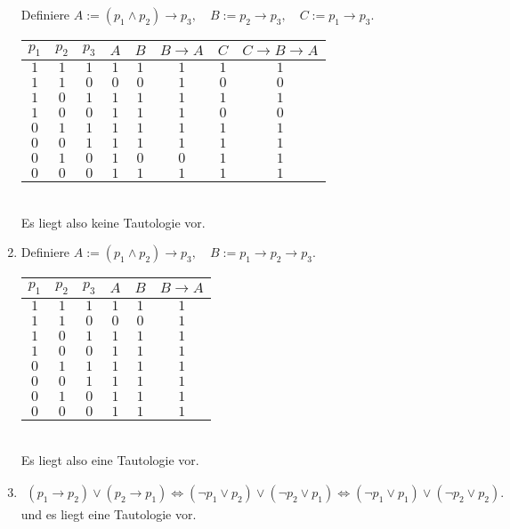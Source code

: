 \begin{solution}
\begin{enumerate}[label = \alph*.]
    Definiere $A := (p_1 \land p_2) \to p_3, \quad B := p_2 \to p_3, \quad C:= p_1 \to p_3$. \\
    \begin{tabular}{|c|c|c|c|c|c|c|c|}
    \hline
    $p_1$ & $p_2$ & $p_3$ & $A$ & $B$ & $B \to A$
    & $C$ & $C \to B \to A$\\
    \hline
    $1$ & $1$ & $1$ & $1$ & $1$ & $1$ & $1$ & $1$\\
    \hline
    $1$ & $1$ & $0$ & $0$ & $0$ & $1$ & $0$ & $0$\\
    \hline
    $1$ & $0$ & $1$ & $1$ & $1$ & $1$ & $1$ & $1$\\
    \hline
    $1$ & $0$ & $0$ & $1$ & $1$ & $1$ & $0$ & $0$\\
    \hline
    $0$ & $1$ & $1$ & $1$ & $1$ & $1$ & $1$ & $1$\\
    \hline
    $0$ & $0$ & $1$ & $1$ & $1$ & $1$ & $1$ & $1$\\
    \hline
    $0$ & $1$ & $0$ & $1$ & $0$ & $0$ & $1$ & $1$\\
    \hline
    $0$ & $0$ & $0$ & $1$ & $1$ & $1$ & $1$ & $1$\\
    \hline
    \end{tabular} \\
    Es liegt also keine Tautologie vor.
    \item
    Definiere $A:= (p_1 \land p_2) \to p_3, \quad B := p_1 \to p_2 \to p_3$. \\
    \begin{tabular}{|c|c|c|c|c|c|}
    \hline
    $p_1$ & $p_2$ & $p_3$ & $A$ & $B$ & $B \to A$\\
    \hline
    $1$ & $1$ & $1$ & $1$ & $1$ & $1$\\
    \hline
    $1$ & $1$ & $0$ & $0$ & $0$ & $1$\\
    \hline
    $1$ & $0$ & $1$ & $1$ & $1$ & $1$\\
    \hline
    $1$ & $0$ & $0$ & $1$ & $1$ & $1$\\
    \hline
    $0$ & $1$ & $1$ & $1$ & $1$ & $1$\\
    \hline
    $0$ & $0$ & $1$ & $1$ & $1$ & $1$\\
    \hline
    $0$ & $1$ & $0$ & $1$ & $1$ & $1$\\
    \hline
    $0$ & $0$ & $0$ & $1$ & $1$ & $1$\\
    \hline
    \end{tabular} \\
    Es liegt also eine Tautologie vor.
    \item
    \begin{align*}
      (p_1 \to p_2) \lor (p_2 \to p_1) \iff (\neg p_1 \lor p_2) \lor (\neg p_2 \lor p_1) \iff (\neg p_1 \lor p_1) \lor (\neg p_2 \lor p_2).
    \end{align*}
    und es liegt eine Tautologie vor.
\end{enumerate}

\end{solution}

